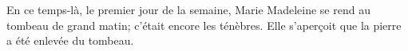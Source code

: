 En ce temps-là, le premier jour de la semaine,
	Marie Madeleine se rend au tombeau de grand matin;
	c’était encore les ténèbres.
Elle s’aperçoit que la pierre a été enlevée du tombeau.
